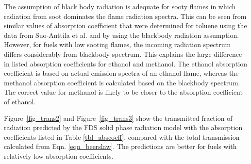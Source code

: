 The assumption of black body radiation is adequate for sooty flames in which radiation from soot dominates the flame radiation spectra. This can be seen from similar values of absorption coefficient that were determined for toluene using the data from Suo-Anttila et al. and by using the blackbody radiation assumption. However, for fuels with low sooting flames, the incoming radiation spectrum differs considerably from blackbody spectrum. This explains the large difference in listed absorption coefficients for ethanol and methanol. The ethanol absorption coefficient is based on actual emission spectra of an ethanol flame, whereas the methanol absorption coefficient is calculated based on the blackbody spectrum. The correct value for methanol is likely to be closer to the absorption coefficient of ethanol. 

Figure~\ref{fig_trans2} and Figure~\ref{fig_trans3} show the transmitted fraction of radiation predicted by the FDS solid phase radiation model with the absorption coefficients listed in Table \ref{tbl_abscoeff}, compared with the total transmission calculated from Eqn. \ref{eqn_beerslaw}. The predictions are better for fuels with relatively low absorption coefficients. 

